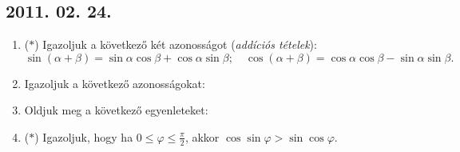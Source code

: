\subsection*{2011. 02. 24.}
\begin{enumerate}
\item ($*$) Igazoljuk a következő két azonosságot (\emph{addíciós tételek}):
\[\sin(\alpha+\beta)=\sin\alpha\cos\beta+\cos\alpha\sin\beta;\quad \cos(\alpha+\beta)=\cos\alpha\cos\beta-\sin\alpha\sin\beta.\]
\item Igazoljuk a következő azonosságokat:
\item Oldjuk meg a következő egyenleteket:
\item ($*$) Igazoljuk, hogy ha $0\le\varphi\le\frac{\pi}{2}$, akkor $\cos\sin\varphi>\sin\cos\varphi$.
\end{enumerate}

